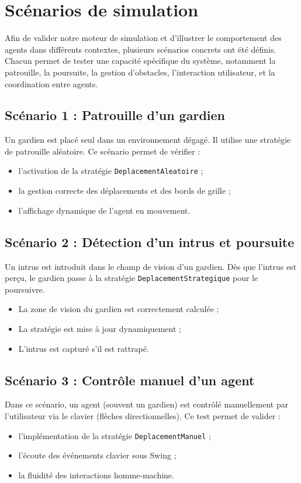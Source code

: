 \section{Scénarios de simulation}

Afin de valider notre moteur de simulation et d’illustrer le comportement des agents dans différents contextes, plusieurs scénarios concrets ont été définis. Chacun permet de tester une capacité spécifique du système, notamment la patrouille, la poursuite, la gestion d’obstacles, l’interaction utilisateur, et la coordination entre agents.

\subsection{Scénario 1 : Patrouille d’un gardien}
Un gardien est placé seul dans un environnement dégagé. Il utilise une stratégie de patrouille aléatoire. Ce scénario permet de vérifier :
\begin{itemize}
    \item l’activation de la stratégie \texttt{DeplacementAleatoire} ;
    \item la gestion correcte des déplacements et des bords de grille ;
    \item l’affichage dynamique de l’agent en mouvement.
\end{itemize}

\subsection{Scénario 2 : Détection d’un intrus et poursuite}
Un intrus est introduit dans le champ de vision d’un gardien. Dès que l’intrus est perçu, le gardien passe à la stratégie \texttt{DeplacementStrategique} pour le poursuivre.
\begin{itemize}
    \item La zone de vision du gardien est correctement calculée ;
    \item La stratégie est mise à jour dynamiquement ;
    \item L’intrus est capturé s’il est rattrapé.
\end{itemize}

\subsection{Scénario 3 : Contrôle manuel d’un agent}
Dans ce scénario, un agent (souvent un gardien) est contrôlé manuellement par l’utilisateur via le clavier (flèches directionnelles). Ce test permet de valider :
\begin{itemize}
    \item l’implémentation de la stratégie \texttt{DeplacementManuel} ;
    \item l’écoute des événements clavier sous Swing ;
    \item la fluidité des interactions homme-machine.
\end{itemize}

